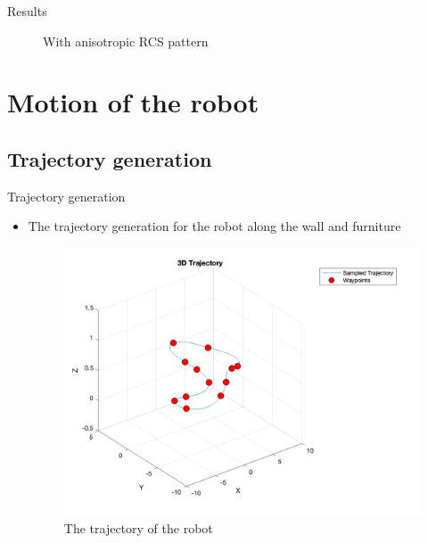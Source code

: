 \documentclass{beamer}
\newcounter{section}
\begin{document}
\begin{frame}[t]{Results}
\begin{itemize}
\begin{figure}
\begin{minipage}{0.45\textwidth}
                    \caption{With anisotropic RCS pattern}
                \end{minipage}
            \end{figure}
	\end{itemize}
\end{frame}




\section{Motion of the robot}
\subsection{Trajectory generation}
\setcounter{section}{4}
\setcounter{figure}{0}
\begin{frame}[t]{Trajectory generation}
	\begin{itemize}
	    \item The trajectory generation for the robot along the wall and furniture
        \vspace{0.5\baselineskip}
            \begin{figure}
            	\centering
            	\includegraphics[scale=.18]{figures/trajectory.png}
            	\caption{The trajectory of the robot}
            \end{figure}
	\end{itemize}
\end{frame}
\end{document}
